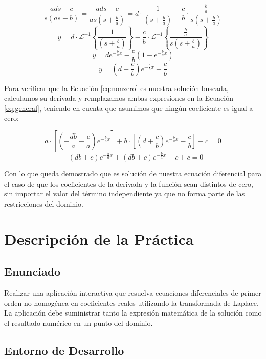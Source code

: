 \documentclass[a4paper]{article}
\begin{document}
    \[ \frac{ads - c}{s(as + b)} = \frac{ads - c}{as\left(s + \frac{b}{a}\right)} = d \cdot \frac{1}{\left(s + \frac{b}{a}\right)} - \frac{c}{b} \cdot \frac{\frac{b}{a}}{s\left(s + \frac{b}{a}\right)} \]
    \[ y = d \cdot \mathcal{L}^{-1}\left\{\frac{1}{\left(s + \frac{b}{a}\right)}\right\} - \frac{c}{b} \cdot \mathcal{L}^{-1}\left\{\frac{\frac{b}{a}}{s\left(s + \frac{b}{a}\right)}\right\} \]
    \[ y = de^{-\frac{b}{a}x} - \frac{c}{b}\left(1 - e^{-\frac{b}{a}x}\right) \]
\begin{equation}
    y = \left( d + \frac{c}{b} \right) e^{ - \frac{b}{a} x } - \frac{c}{b}  \label{eq:nonzero}
\end{equation}

Para verificar que la Ecuación \ref{eq:nonzero} es nuestra 
solución buscada, calculamos su derivada y remplazamos ambas 
expresiones en la Ecuación \ref{eq:general}, teniendo en 
cuenta que asumimos que ningún coeficiente es igual a cero:

    \[ a \cdot \left[ \left( - \frac{db}{a} - \frac{c}{a} \right) e^{ - \frac{b}{a} x } \right] + b \cdot \left[ \left( d + \frac{c}{b} \right) e^{ - \frac{b}{a} x } - \frac{c}{b} \right] + c = 0 \]
    \[ - \left( db + c \right) e^{ - \frac{b}{a} x } + \left( db + c \right) e^{ - \frac{b}{a} x } - c + c = 0 \]

Con lo que queda demostrado que es solución de nuestra ecuación
diferencial para el caso de que los coeficientes de la derivada
y la función sean distintos de cero, sin importar el valor del
término independiente ya que no forma parte de las restricciones
del dominio.

\section{Descripción de la Práctica}

\subsection{Enunciado}

Realizar una aplicación interactiva que resuelva ecuaciones 
diferenciales de primer orden no homogénea en coeficientes 
reales utilizando la transformada de Laplace.
La aplicación debe suministrar tanto la expresión matemática
de la solución como el resultado numérico en un punto del
dominio. 

\subsection{Entorno de Desarrollo}
\end{document}
